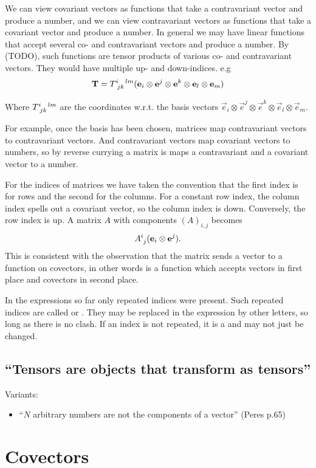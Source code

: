 We can view covariant vectors as functions that take a contravariant vector and produce a number, and we can view contravariant vectors as functions that take a covariant vector and produce a number. In general we may have linear functions that accept several co- and contravariant vectors and produce a number. By (TODO), such functions are tensor products of various co- and contravariant vectors. They would have multiple up- and down-indices. e.g\
\[ \vec{T} = \tensor{T}{^i_j_k^l^m}(\vec{e}_i\otimes \vec{e}^j\otimes \vec{e}^k\otimes \vec{e}_l \otimes \vec{e}_m) \]

Where $\tensor{T}{^i_j_k^l^m}$ are the coordinates w.r.t. the basis vectors $\vec{e}_i\otimes \vec{e}^j\otimes \vec{e}^k \otimes\vec{e}_l \otimes \vec{e}_m$.

For example, once the basis has been chosen, matrices map contravariant vectors to contravariant vectors. And contravariant vectors map covariant vectors to numbers, so by reverse currying a matrix is maps a contravariant and a covariant vector to a number.

For the indices of matrices we have taken the convention that the first index is for rows and the second for the columns. For a constant row index, the column index spells out a covariant vector, so the column index is down. Conversely, the row index is up. A matrix $A$ with components $(A)_{i,j}$ becomes
\[ \tensor{A}{^i_j}(\vec{e}_i\otimes \vec{e}^j). \]
This is consistent with the observation that the matrix sends a vector to a function on covectors, in other words is a function which accepts vectors in first place and covectors in second place.

In the expressions so far only repeated indices were present. Such repeated indices are called   or . They may be replaced in the expression by other letters, so long as there is no clash. If an index is not repeated, it is a  and may not just be changed.

\subsection{``Tensors are objects that transform as tensors''}
Variants:
\begin{itemize}
\item ``$N$ arbitrary numbers are not the components of a vector'' (Peres p.65)
\end{itemize}


\section{Covectors}

